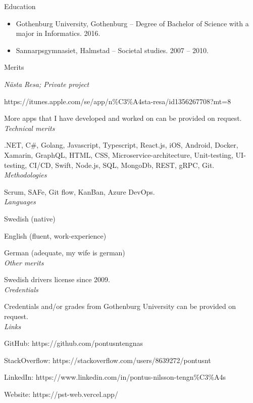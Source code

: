 \vspace{12px}

{\itshape\Large\begin{center}
Education
\end{center}}

\vspace{12px}

\begin{itemize}
  \item Gothenburg University, Gothenburg – Degree of Bachelor of Science with a major in Informatics. 2016.

  \item Sannarpsgymnasiet, Halmstad – Societal studies. 2007 – 2010.
\end{itemize}

\newpage

{\itshape\Large\begin{center}
Merits
\end{center}}

\vspace{12px}

{\itshape Nästa Resa; Private project}

https://itunes.apple.com/se/app/n\%C3\%A4sta-resa/id1356267708?mt=8

More apps that I have developed and worked on can be provided on request.\\

{\itshape Technical merits}

.NET, C\#, Golang, Javascript, Typescript, React.js, iOS, Android, Docker, Xamarin, GraphQL, HTML,
CSS, Microservice-architecture, Unit-testing, UI-testing, CI/CD, Swift, Node.js, SQL, MongoDb, REST, gRPC, Git.\\

{\itshape Methodologies}

Scrum, SAFe, Git flow, KanBan, Azure DevOps.\\

{\itshape Languages}

Swedish (native)

English (fluent, work-experience)

German (adequate, my wife is german)\\

{\itshape Other merits}

Swedish drivers license since 2009.\\

{\itshape Credentials}

Credentials and/or grades from Gothenburg University can be provided on request.\\

{\itshape Links}

GitHub: https://github.com/pontusntengnas

StackOverflow: https://stackoverflow.com/users/8639272/pontusnt

LinkedIn: https://www.linkedin.com/in/pontus-nilsson-tengn\%C3\%A4s

Website: https://pst-web.vercel.app/

